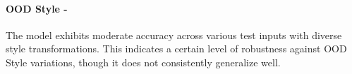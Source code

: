 \paragraph{OOD Style - \moderate} 
The model exhibits moderate accuracy across various test inputs with diverse style transformations. This indicates a certain level of robustness against OOD Style variations, though it does not consistently generalize well.
